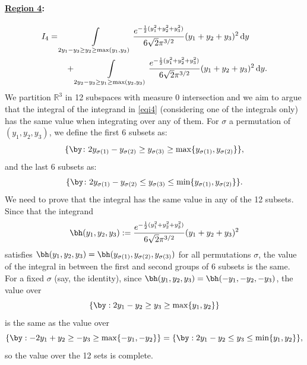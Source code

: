 \documentclass[11pt]{article}
\numberwithin{equation}{section}
\numberwithin{figure}{section}
\begin{document}
\paragraph{\underline{Region 4}:}
\begin{align}
        I_4 
        &= \int\displaylimits_{ 2y_1 - y_3 \geq y_2 \geq \max(y_1, y_3)}  \frac{e^{-\frac{1}{2}(y_1^2 + y_2^2 +y_3^2)}}{6 \sqrt{2} \pi ^{3/2}} (y_1 + y_2 + y_3)^2 \, \mathrm{d}y \nonumber \\
        & \qquad + \int\displaylimits_{ 2y_2 - y_3 \geq y_1 \geq \max(y_2, y_3)}  \frac{e^{-\frac{1}{2}(y_1^2 + y_2^2 +y_3^2)}}{6 \sqrt{2} \pi ^{3/2}} (y_1 + y_2 + y_3)^2 \, \mathrm{d}y. \label{eqi4}
\end{align}
We partition $\mathbb R^3$ in 12 subspaces with measure 0 intersection and we aim to argue that the integral of the integrand in \eqref{eqi4} (considering one of the integrals only) has the same value when integrating over any of them. For $\sigma$ a permutation of $(y_1, y_2, y_3)$, we define the first 6 subsets as:
\[
\{\by \colon 2y_{\sigma(1)} - y_{\sigma(2)} \geq y_{\sigma(3)} \geq \max\{y_{\sigma(1)}, y_{\sigma(2)}\}\},
\]
and the last 6 subsets as: 
\[\{\by \colon 2y_{\sigma(1)} - y_{\sigma(2)} \leq y_{\sigma(3)} \leq \min\{y_{\sigma(1)}, y_{\sigma(2)}\}\}.
\]
We need to prove that the integral has the same value in any of the 12 subsets. 
Since that the integrand 
\[
\bh(y_1, y_2, y_3) := \frac{e^{-\frac{1}{2}(y_1^2 + y_2^2 +y_3^2)}}{6 \sqrt{2} \pi ^{3/2}} (y_1 + y_2 + y_3)^2
\]
satisfies $\bh(y_1, y_2, y_3) = \bh(y_{\sigma(1)},y_{\sigma(2)},y_{\sigma(3)})$ for all permutations $\sigma$, the value of the integral in between the first and second groups of 6 subsets is the same. 
For a fixed $\sigma$ (say, the identity), since $\bh(y_1, y_2, y_3) = \bh(-y_1, -y_2,-y_3)$, the value over 
\[\{ \by: 2y_1-y_2 \geq y_3 \geq \max\{y_1,y_2\} \}\] is the same as the value over 
\[\{ \by: -2y_1+y_2 \geq -y_3 \geq \max\{-y_1,-y_2\} \} = \{ \by: 2y_1-y_2 \leq y_3 \leq \min\{y_1,y_2\} \},
\]
so the value over the 12 sets is complete. 
\end{document}
